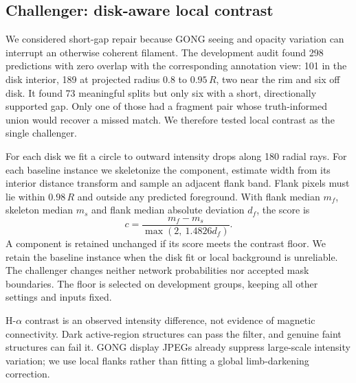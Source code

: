 \subsection{Challenger: disk-aware local contrast}
We considered short-gap repair because GONG seeing and opacity variation can interrupt an otherwise coherent filament. The development audit found 298 predictions with zero overlap with the corresponding annotation view: 101 in the disk interior, 189 at projected radius \(0.8\) to \(0.95\,R\), two near the rim and six off disk. It found 73 meaningful splits but only six with a short, directionally supported gap. Only one of those had a fragment pair whose truth-informed union would recover a missed match. We therefore tested local contrast as the single challenger.

For each disk we fit a circle to outward intensity drops along 180 radial rays. For each baseline instance we skeletonize the component, estimate width from its interior distance transform and sample an adjacent flank band. Flank pixels must lie within \(0.98\,R\) and outside any predicted foreground. With flank median \(m_f\), skeleton median \(m_s\) and flank median absolute deviation \(d_f\), the score is
\[
 c=\frac{m_f-m_s}{\max(2,\ 1.4826d_f)}.
\]
A component is retained unchanged if its score meets the contrast floor. We retain the baseline instance when the disk fit or local background is unreliable. The challenger changes neither network probabilities nor accepted mask boundaries. The floor is selected on development groups, keeping all other settings and inputs fixed.

H-\(\alpha\) contrast is an observed intensity difference, not evidence of magnetic connectivity. Dark active-region structures can pass the filter, and genuine faint structures can fail it. GONG display JPEGs already suppress large-scale intensity variation; we use local flanks rather than fitting a global limb-darkening correction.
